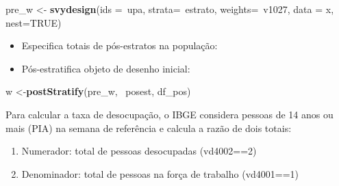 \documentclass[]{book}
\newenvironment{Shaded}{\begin{snugshade}}{\end{snugshade}}
\newcommand{\KeywordTok}[1]{\textcolor[rgb]{0.13,0.29,0.53}{\textbf{{#1}}}}
\newcommand{\DataTypeTok}[1]{\textcolor[rgb]{0.13,0.29,0.53}{{#1}}}
\newcommand{\StringTok}[1]{\textcolor[rgb]{0.31,0.60,0.02}{{#1}}}
\newcommand{\OtherTok}[1]{\textcolor[rgb]{0.56,0.35,0.01}{{#1}}}
\newcommand{\NormalTok}[1]{{#1}}
\providecommand{\tightlist}{%
  \setlength{\itemsep}{0pt}\setlength{\parskip}{0pt}}
\numberwithin{example}{chapter}
\numberwithin{remark}{chapter}
\numberwithin{definition}{chapter}
\begin{document}
\begin{Shaded}
\begin{Highlighting}[]
\NormalTok{pre_w <-}\StringTok{ }\KeywordTok{svydesign}\NormalTok{(}\DataTypeTok{ids =}\NormalTok{~upa, }\DataTypeTok{strata=}\NormalTok{~estrato, }
  \DataTypeTok{weights=}\NormalTok{~v1027, }\DataTypeTok{data =} \NormalTok{x, }\DataTypeTok{nest=}\OtherTok{TRUE}\NormalTok{)}
\end{Highlighting}
\end{Shaded}

\begin{itemize}
\tightlist
\item
  Especifica totais de pós-estratos na população:
\end{itemize}

\begin{Shaded}
\end{Shaded}

\begin{itemize}
\tightlist
\item
  Pós-estratifica objeto de desenho inicial:
\end{itemize}

\begin{Shaded}
\begin{Highlighting}[]
\NormalTok{w <-}\KeywordTok{postStratify}\NormalTok{(pre_w, ~posest, df_pos)}
\end{Highlighting}
\end{Shaded}

Para calcular a taxa de desocupação, o IBGE considera pessoas de 14 anos
ou mais (PIA) na semana de referência e calcula a razão de dois totais:

\begin{enumerate}
\def\labelenumi{\arabic{enumi}.}
\item
  Numerador: total de pessoas desocupadas (vd4002==2)
\item
  Denominador: total de pessoas na força de trabalho (vd4001==1)
\end{enumerate}
\end{document}
